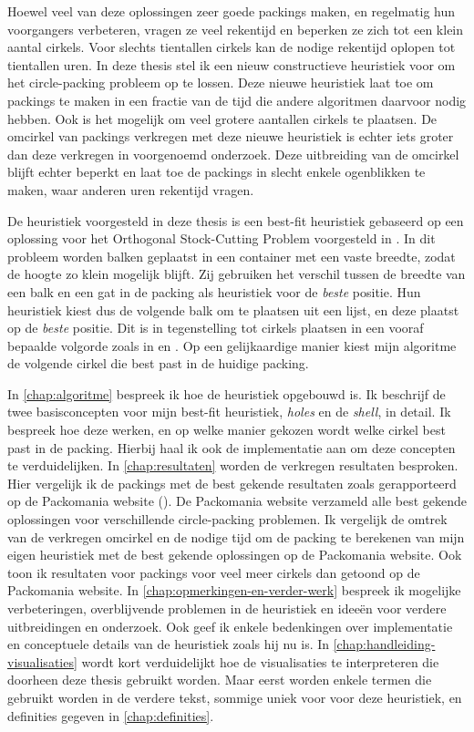 \documentclass[12pt,a4paper,oneside]{book}
\begin{document}
Hoewel veel van deze oplossingen zeer goede packings maken, en regelmatig hun voorgangers verbeteren, vragen ze veel rekentijd en beperken ze zich tot een klein aantal cirkels.
Voor slechts tientallen cirkels kan de nodige rekentijd oplopen tot tientallen uren.
In deze thesis stel ik een nieuw constructieve heuristiek voor om het circle-packing probleem op te lossen.
Deze nieuwe heuristiek laat toe om packings te maken in een fractie van de tijd die andere algoritmen daarvoor nodig hebben.
Ook is het mogelijk om veel grotere aantallen cirkels te plaatsen.
De omcirkel van packings verkregen met deze nieuwe heuristiek is echter iets groter dan deze verkregen in voorgenoemd onderzoek.
Deze uitbreiding van de omcirkel blijft echter beperkt en laat toe de packings in slecht enkele ogenblikken te maken, waar anderen uren rekentijd vragen.

De heuristiek voorgesteld in deze thesis is een best-fit heuristiek gebaseerd op een oplossing voor het Orthogonal Stock-Cutting Problem voorgesteld in \cite{burke2004new}.
In dit probleem worden balken geplaatst in een container met een vaste breedte, zodat de hoogte zo klein mogelijk blijft.
Zij gebruiken het verschil tussen de breedte van een balk en een gat in de packing als heuristiek voor de \textit{beste} positie.
Hun heuristiek kiest dus de volgende balk om te plaatsen uit een lijst, en deze plaatst op de \textit{beste} positie.
Dit is in tegenstelling tot cirkels plaatsen in een vooraf bepaalde volgorde zoals in \cite{grosso2010} en \cite{jors2011}.
Op een gelijkaardige manier kiest mijn algoritme de volgende cirkel die best past in de huidige packing.

In \autoref{chap:algoritme} bespreek ik hoe de heuristiek opgebouwd is.
Ik beschrijf de twee basisconcepten voor mijn best-fit heuristiek, \textit{holes} en de \textit{shell}, in detail.
Ik bespreek hoe deze werken, en op welke manier gekozen wordt welke cirkel best past in de packing.
Hierbij haal ik ook de implementatie aan om deze concepten te verduidelijken.
In \autoref{chap:resultaten} worden de verkregen resultaten besproken.
Hier vergelijk ik de packings met de best gekende resultaten zoals gerapporteerd op de Packomania website (\cite{packomania}).
De Packomania website verzameld alle best gekende oplossingen voor verschillende circle-packing problemen.
Ik vergelijk de omtrek van de verkregen omcirkel en de nodige tijd om de packing te berekenen van mijn eigen heuristiek met de best gekende oplossingen op de Packomania website.
Ook toon ik resultaten voor packings voor veel meer cirkels dan getoond op de Packomania website.
In \autoref{chap:opmerkingen-en-verder-werk} bespreek ik mogelijke verbeteringen, overblijvende problemen in de heuristiek en ideeën voor verdere uitbreidingen en onderzoek.
Ook geef ik enkele bedenkingen over implementatie en conceptuele details van de heuristiek zoals hij nu is.
In \autoref{chap:handleiding-visualisaties} wordt kort verduidelijkt hoe de visualisaties te interpreteren die doorheen deze thesis gebruikt worden.
Maar eerst worden enkele termen die gebruikt worden in de verdere tekst, sommige uniek voor voor deze heuristiek, en definities gegeven in \autoref{chap:definities}.
\end{document}
